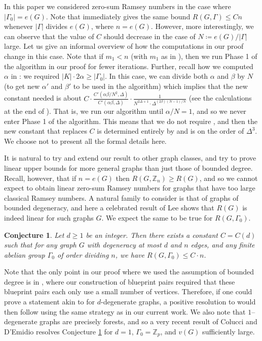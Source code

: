 \documentclass{article}
\newtheorem{conjecture}[problem]{Conjecture}
\theoremstyle{definition}
\begin{document}
In this paper we considered zero-sum Ramsey numbers in the case where $|\Gamma_0|=e(G)$. Note that  immediately gives the same bound $R(G, \Gamma)\leq C n$ whenever $|\Gamma|$ divides $e(G)$, where $n=e(G)$. However, more interestingly, we can observe that the value of $C$ should decrease in the case of $N\coloneqq  e(G)/|\Gamma|$ large. Let us give an informal overview of how the computations in our proof change in this case. Note that if $m_1<n$ (with $m_1$ as in ), then we run Phase 1 of the algorithm in our proof for fewer iterations. Further, recall how we computed $\alpha$ in : we required $|K|\cdot 2\alpha \geq |\Gamma_0|$. In this case, we can divide both $\alpha$ and $\beta$ by $N$ (to get new $\alpha'$ and $\beta'$ to be used in the algorithm) which implies that the new constant needed is about $C\cdot \frac{C'(\alpha\beta/N^2,\Delta)}{C'(\alpha\beta,\Delta)}\cdot \frac{1}{N^{2\Delta+1}\cdot \Delta^{(2\beta)(N-1)/N}}$ (see the calculations at the end of ). That is, we run our algorithm until $\alpha/N=1$, and so we never enter Phase 1 of the algorithm. This means that we do not require , and then the new constant that replaces $C$ is determined entirely by  and is on the order of $\Delta^3$. We choose not to present all the formal details here.

It is natural to try and extend our result to other graph classes, and try to prove linear upper bounds for more general graphs than just those of bounded degree. Recall, however, that if $n=e(G)$ then $R(G, \mathbb{Z}_n)\geq R(G)$, and so we cannot expect to obtain linear zero-sum Ramsey numbers for graphs that have too large classical Ramsey numbers. A natural family to consider is that of graphs of bounded degeneracy, and here a celebrated result of Lee \cite{Lee17} shows that $R(G)$ is indeed linear for such graphs $G$. We expect the same to be true for $R(G, \Gamma_0)$. 
\begin{conjecture}\label{prob:degenerate}
    Let $d\geq 1$ be an integer. Then there exists a constant $C=C(d)$ such that for any graph $G$ with degeneracy at most $d$ and $n$ edges, and any finite abelian group $\Gamma_0$ of order dividing $n$, we have $R(G, \Gamma_0)\leq C\cdot n$.
\end{conjecture}

Note that the only point in our proof where we used the assumption of bounded degree is in , where our construction of blueprint pairs required that these blueprint pairs each only use a small number of vertices. Therefore, if one could prove a statement akin to  for $d$-degenerate graphs, a positive resolution to  would then follow using the same strategy as in our current work. We also note that $1$--degenerate graphs are precisely forests, and so a very recent result of Colucci and D'Emidio \cite{CD25} resolves Conjecture \ref{prob:degenerate} for $d=1$, $\Gamma_0=\mathbb{Z}_p$, and $v(G)$ sufficiently large.
\end{document}
